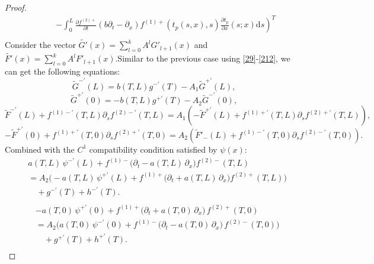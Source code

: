 \documentclass[a4paper,reqno,11pt]{amsart}
\numberwithin{equation}{section} %
\begin{document}
\begin{proof}
$$\begin{aligned}
& \quad  \quad\left.-\int_0^L{\frac{\partial f^{\left( 2 \right) +}}{\partial t}\left( b\partial _t-\partial _x \right) f^{\left( 1 \right) +}\left( t_p\left( s,x \right) ,s \right) \frac{\partial t_p}{\partial x}\left( s;x \right) \mathrm{d}s} \right) ^T\\
\end{aligned}
$$
Consider the vector $\tilde{G'}  (x) = \sum_{l=0}^k A^l G '_{l+1}(x)$ and  $\tilde{F'}  (x) = \sum_{l=0}^k A^l F '_{l+1}(x)$.Similar to the previous case using \eqref{29}-\eqref{212}, we can get the following equations:
$$
\tilde{G}^{-\prime}\left( L \right) =b\left( T,L \right) g^{-\prime}\left( T \right) -A_1\tilde{G}^{+\prime}\left( L \right) ,
$$
$$
\tilde{G}^{+\prime}\left( 0 \right) =-b\left( T,L \right) g^{+\prime}\left( T \right) -A_2\tilde{G}^{-\prime}\left( 0 \right) ,
$$
$$
\tilde{F}^{-\prime}\left( L \right) +f^{\left( 1 \right) -\prime}\left( T,L \right) \partial _sf^{\left( 2 \right) -\prime}\left( T,L \right) =A_1\left( -\tilde{F}^{+\prime}\left( L \right) +f^{\left( 1 \right) +\prime}\left( T,L \right) \partial _sf^{\left( 2 \right) +\prime}\left( T,L \right) \right) ,
$$
$$
-\tilde{F}^{+\prime}\left( 0 \right) +f^{\left( 1 \right) +\prime}\left( T,0 \right) \partial _sf^{\left( 2 \right) +\prime}\left( T,0 \right) =A_2\left( \tilde{F}\prime _-\left( L \right) +f^{\left( 1 \right) -\prime}\left( T,0 \right) \partial _sf^{\left( 2 \right) -\prime}\left( T,0 \right) \right) .
$$
Combined with the $C^1$ compatibility condition satisfied by $\psi (x)$:
$$
\begin{aligned}
	&a(T,L)\,\psi ^{-\prime}(L)+f^{\left( 1 \right) -}\bigl( \partial _t-a(T,L)\,\partial _x \bigr) f^{\left( 2 \right) -}(T,L)\\
	&=A_2\bigl( -a(T,L)\,\psi ^{+\prime}(L)+f^{\left( 1 \right) +}\bigl( \partial _t+a(T,L)\,\partial _x \bigr) f^{\left( 2 \right) +}(T,L) \bigr)\\
	&\quad +g^{-\prime}(T)+h^{-\prime}(T).\\
\end{aligned}
$$
$$
\begin{aligned}
	&-a(T,0)\,\psi ^{+\prime}(0)+f^{\left( 1 \right) +}\bigl( \partial _t+a(T,0)\,\partial _x \bigr) \,f^{\left( 2 \right) +}(T,0)\\
	&=A_2\bigl( a(T,0)\,\psi ^{-\prime}(0)+f^{\left( 1 \right) -}\bigl( \partial _t-a(T,0)\,\partial _x \bigr) \,f^{\left( 2 \right) -}(T,0) \bigr)\\
	&\quad +g^{+\prime}(T)+h^{+\prime}(T).\\
\end{aligned}
$$
\end{proof}
\end{document}
